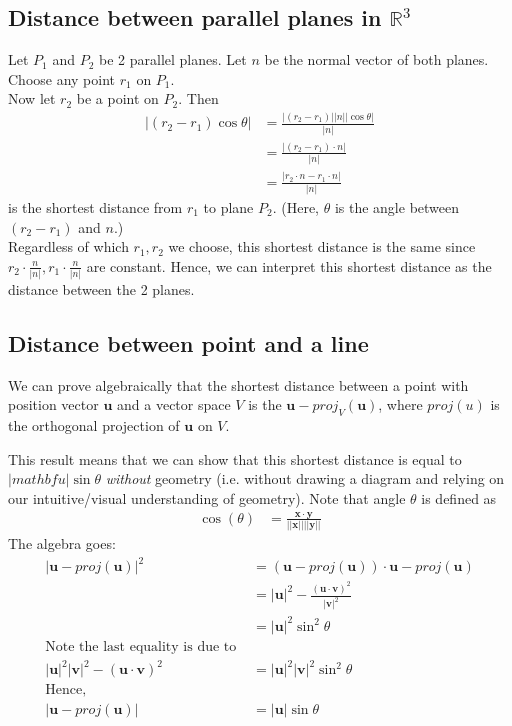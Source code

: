 \documentclass{article}
\begin{document}
\subsection{Distance between parallel planes in $\mathbb{R}^3$}
Let $P_1$ and $P_2$ be 2 parallel planes. Let $n$ be the normal vector of both planes.\\
Choose any point $r_1$ on $P_1$.\\
Now let $r_2$ be a point on $P_2$. Then 
\begin{align*}
	|(r_2 - r_1)\cos\theta|&=\frac{|(r_2 - r_1)||n||\cos\theta|}{|n|}\\
	&= \frac{|(r_2 - r_1)\cdot n|}{|n|}\\
	&= \frac{|r_2\cdot n - r_1\cdot n |}{|n|}
\end{align*}
 is the shortest distance from $r_1$ to plane $P_2$. (Here, $\theta$ is the angle between $(r_2-r_1)$ and $n$.)\\
Regardless of which $r_1,r_2$ we choose, this shortest distance is the same since $r_2\cdot \frac{n}{|n|}, r_1\cdot \frac{n}{|n|}$ are constant. Hence, we can interpret this shortest distance as the distance between the 2 planes.

\subsection{Distance between point and a line}
We can prove algebraically that the shortest distance between a point with position vector $\mathbf{u}$ and a vector space $V$ is the $\mathbf{u} -proj_V(\mathbf{u})$, where $proj(u)$ is the orthogonal projection of $\mathbf{u}$ on $V$.

This result means that we can show that this shortest distance is equal to $|mathbf{u}|\sin \theta$ \textit{without} geometry (i.e. without drawing a diagram and relying on our intuitive/visual understanding of geometry). Note that angle $\theta$ is defined as 
\begin{align*}
	\cos(\theta) &= \frac{\mathbf{x}\cdot \mathbf{y}}{||\mathbf{x}||||\mathbf{y}||}
\end{align*}
The algebra goes:
\begin{align*}
	|\mathbf{u}-proj(\mathbf{u})|^2&=(\mathbf{u}-proj(\mathbf{u}))\cdot \mathbf{u}-proj(\mathbf{u})\\
	&= |\mathbf{u}|^2-\frac{(\mathbf{u}\cdot \mathbf{v})^2}{|\mathbf{v}|^2}\\
	&=|\mathbf{u}|^2\sin^2\theta\\
	\text{Note the last equality is due to }\\
	|\mathbf{u}|^2|\mathbf{v}|^2-(\mathbf{u}\cdot \mathbf{v})^2&=|\mathbf{u}|^2|\mathbf{v}|^2\sin^2\theta\\
	\text{Hence, }\\ 
	|\mathbf{u}-proj(\mathbf{u})|&=|\mathbf{u}|\sin\theta
\end{align*}
\end{document}
